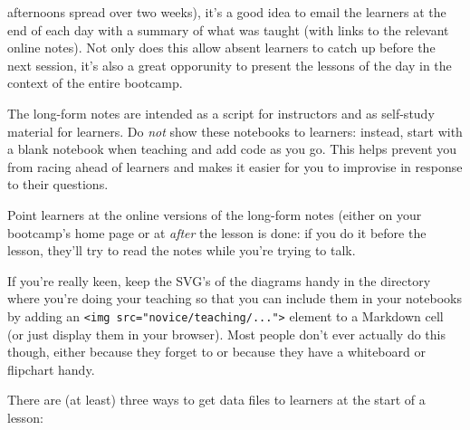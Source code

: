 \documentclass{book}
\begin{document}
\begin{swcitemize}
  afternoons spread over two weeks), it's a good idea to email the
  learners at the end of each day with a summary of what was taught
  (with links to the relevant online notes). Not only does this allow
  absent learners to catch up before the next session, it's also a great
  opporunity to present the lessons of the day in the context of the
  entire bootcamp.
\item
  The long-form notes are intended as a script for instructors and as
  self-study material for learners. Do \emph{not} show these notebooks
  to learners: instead, start with a blank notebook when teaching and
  add code as you go. This helps prevent you from racing ahead of
  learners and makes it easier for you to improvise in response to their
  questions.
\item
  Point learners at the online versions of the long-form notes (either
  on your bootcamp's home page or at
  \emph{after} the lesson is done: if you do it before the lesson,
  they'll try to read the notes while you're trying to talk.
\item
  If you're really keen, keep the SVG's of the diagrams handy in the
  directory where you're doing your teaching so that you can include
  them in your notebooks by adding an
  \texttt{\textless{}img src="novice/teaching/..."\textgreater{}}
  element to a Markdown cell (or just display them in your browser).
  Most people don't ever actually do this though, either because they
  forget to or because they have a whiteboard or flipchart handy.
\item
  There are (at least) three ways to get data files to learners at the
  start of a lesson:


\end{swcitemize}
\end{document}
